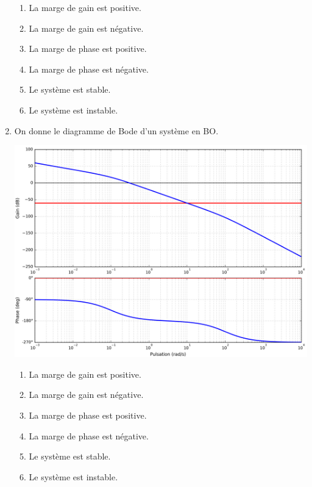 \documentclass[10pt,fleqn]{article} %
\begin{document}
\begin{multicols}{2}
\begin{enumerate}
\begin{center}
\end{center}
\begin{enumerate}
\item La marge de gain est positive.
\item La marge de gain est négative.
\item La marge de phase est positive.
\item La marge de phase est négative.
\item Le système est stable.
\item Le système est instable.
\end{enumerate}
\item On donne le diagramme de Bode d'un système en BO.
\begin{center}
\includegraphics[width=\linewidth]{images/Bode_03}
\end{center}
\begin{enumerate}
\item La marge de gain est positive.
\item La marge de gain est négative.
\item La marge de phase est positive.
\item La marge de phase est négative.
\item Le système est stable.
\item Le système est instable.
\end{enumerate}
\end{enumerate}
\end{multicols}
\end{document}
